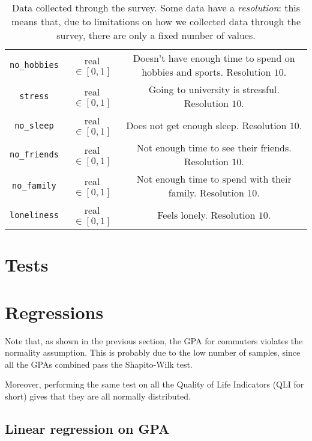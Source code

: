 \documentclass[12pt]{extarticle}
\numberwithin{table}{section}
\numberwithin{figure}{section}
\numberwithin{equation}{section}
\begin{document}
\begin{table}[H]
\begin{center}
\begin{tabular}{|c|c|c|}
			\texttt{no\_hobbies}             & real $\in [0,1]$  & \makecell{Doesn't have enough time to spend on hobbies and sports. \\ Resolution $10$.} \\
			\texttt{stress}                  & real $\in [0,1]$  & Going to university is stressful. Resolution $10$.                 \\
			\texttt{no\_sleep}               & real $\in [0,1]$  & Does not get enough sleep. Resolution $10$.                        \\
			\texttt{no\_friends}             & real $\in [0,1]$  & Not enough time to see their friends. Resolution $10$.             \\
			\texttt{no\_family}              & real $\in [0,1]$  & Not enough time to spend with their family. Resolution $10$.       \\
			\texttt{loneliness}              & real $\in [0,1]$  & Feels lonely. Resolution $10$.                                     \\
			\hline
		\end{tabular}
		\caption{
			Data collected through the survey. Some data have a \textit{resolution}:
			this means that, due to limitations on how we collected data through the survey,
			there are only a fixed number of values.
		}
	\end{center}
\end{table}

\section{Tests}

\section{Regressions}

Note that, as shown in the previous section, the GPA for commuters violates the normality assumption.
This is probably due to the low number of samples, since all the GPAs combined pass the Shapito-Wilk test.

Moreover, performing the same test on all the Quality of Life Indicators (QLI for short)
gives that they are all normally distributed.

\subsection{Linear regression on GPA}
\end{document}
